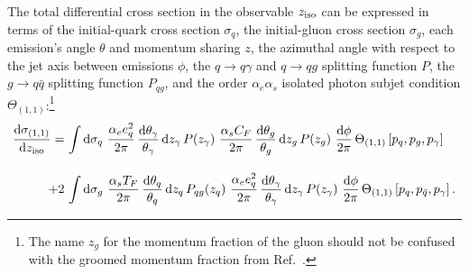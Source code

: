 \documentclass[a4paper,11pt]{article}
\DeclareRobustCommand{\Ref}[1]{Ref.~\cite{#1}}
\newcommand{\ziso}{z_{\rm iso}}
\begin{document}
The total differential cross section in the observable $\ziso$ can be expressed in terms of the initial-quark cross section $\sigma_q$, the initial-gluon cross section $\sigma_g$, each emission's angle $\theta$ and momentum sharing $z$, the azimuthal angle with respect to the jet axis between emissions $\phi$, the $q \rightarrow q \gamma$ and $q \rightarrow q g$ splitting function $P$, the $g \rightarrow q \bar{q}$ splitting function $P_{qg}$, and the order $\alpha_e \alpha_s$ isolated photon subjet condition $\Theta_{(1,1)}$:\footnote{The name $z_g$ for the momentum fraction of the gluon should not be confused with the groomed momentum fraction from \Ref{Larkoski:2015lea}.}
%
\begin{equation}
\begin{split}
    \frac{\text{d}\sigma_{(1,1)}}{\text{d} \ziso} = \,&\int
    \text{d}\sigma_q \,\, \frac{\alpha_e e_q^2}{2 \pi} \,\frac{\text{d} \theta_{\gamma}}{\theta_{\gamma}} \, \text{d} z_{\gamma} \, P(z_{\gamma})
    \,\,
    \frac{\alpha_s C_F}{2 \pi} \,\frac{\text{d} \theta_{g}}{\theta_{g}} \,\text{d} z_{g} \, P(z_{g}) 
    \,\,
    \frac{\text{d} \phi}{2\pi} \,\Theta_{(1,1)} \left[p_q, p_g, p_{\gamma}\right] \\[10pt]
    ~+2\,&\int
    \text{d}\sigma_g \,\, 
    \frac{\alpha_s T_F}{2 \pi} \,\frac{\text{d} \theta_{q}}{\theta_{q}} \,\text{d} z_{q} \, P_{qg}(z_{q})
    \,\,
    \frac{\alpha_e e_q^2}{2 \pi} \,\frac{\text{d} \theta_{\gamma}}{\theta_{\gamma}} \, \text{d} z_{\gamma} \, P(z_{\gamma})
    \,\,
    \frac{\text{d} \phi}{2\pi} \,\Theta_{(1,1)} \left[p_q, p_{\bar{q}}, p_{\gamma}\right].
\end{split}
\label{eq:aeascross}
\end{equation}
\end{document}
